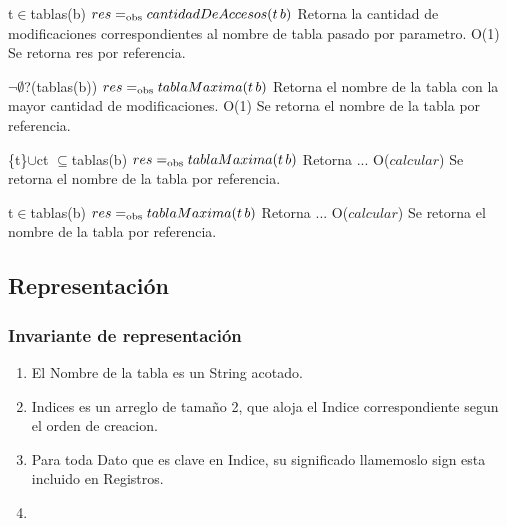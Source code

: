  {t$\in$tablas(b)}
 {$res =_{\mathrm{obs}} cantidadDeAccesos(t\,b)$}
 {Retorna la cantidad de modificaciones correspondientes al nombre de tabla pasado por parametro.}
 {O(1)}
 {Se retorna res por referencia.} 

 {$\neg\emptyset$?(tablas(b))}
 {$res =_{\mathrm{obs}} tablaMaxima(t\,b)$}
 {Retorna el nombre de la tabla con la mayor cantidad de modificaciones.}
 {O(1)}
 {Se retorna el nombre de la tabla por referencia.} 
  
 {\{t\}$\cup$ct $\subseteq$tablas(b)}
 {$res =_{\mathrm{obs}} tablaMaxima(t\,b)$}
 {Retorna ...}
 {O($calcular$)}
 {Se retorna el nombre de la tabla por referencia.}
  
 {t$\in$tablas(b)}
 {$res =_{\mathrm{obs}} tablaMaxima(t\,b)$}
 {Retorna ...}
 {O($calcular$)}
 {Se retorna el nombre de la tabla por referencia.}
  
 
\newpage
\subsection{Representación}

{
}

\subsubsection*{Invariante de representación}

\begin{enumerate}
  \item El Nombre de la tabla es un String acotado.
  \item Indices es un arreglo de tamaño 2, que aloja el Indice correspondiente segun el orden de creacion.
  \item Para toda Dato que es clave en Indice, su significado llamemoslo sign esta incluido en Registros.
  \item 

\end{enumerate}



